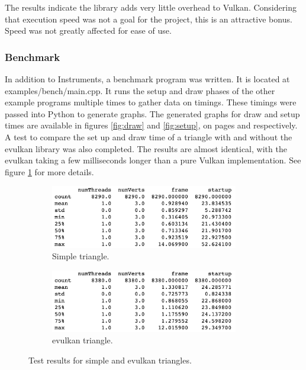 \documentclass[12pt]{report}
\theoremstyle{definition}
\begin{document}
        The results indicate the library adds very little overhead to Vulkan.
        Considering that execution speed was not a goal for the project,
        this is an attractive bonus. Speed was not greatly affected for
        ease of use.

      \subsubsection{Benchmark}

        In addition to Instruments, a benchmark program was written. It is
        located at examples/bench/main.cpp. It runs the setup and draw
        phases of the other example programs multiple times to gather
        data on timings. These timings were passed into Python to
        generate graphs. The generated graphs for draw and setup times are available in figures \ref{fig:draw}
        and \ref{fig:setup}, on pages \pageref{fig:draw} and \pageref{fig:setup} respectively. \\

        A test to compare the set up and draw time of a triangle with and
        without the evulkan library was also completed. The results are
        almost identical, with the evulkan taking a few milliseconds
        longer than a pure Vulkan implementation. See figure \ref{fig:test_describe} 
        for more details. \\

        \begin{figure}[h]
          \begin{subfigure}[b]{0.5\textwidth}
            \centering
            \includegraphics[width=0.9\textwidth]{images/simple_describe.png}
            \caption{Simple triangle.}
          \end{subfigure}
          \begin{subfigure}[b]{0.5\textwidth}
            \centering
            \includegraphics[width=0.9\textwidth]{images/evk_describe.png}
            \caption{evulkan triangle.}
          \end{subfigure}
          \caption{Test results for simple and evulkan triangles.}
          \label{fig:test_describe}                        
        \end{figure}
\end{document}
